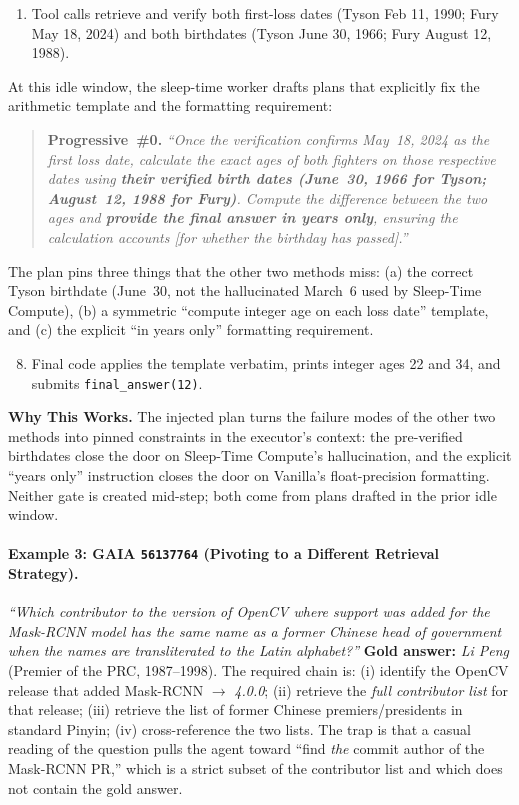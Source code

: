 \begin{tcolorbox}[colback=blue!4, colframe=blue!60!black, title=\textsc{\methodname{}} (Pred: 12 / GT: 12), fontupper=\small, breakable]
\begin{enumerate}
  \item[1-7.] Tool calls retrieve and verify both first-loss dates (Tyson Feb 11, 1990; Fury May 18, 2024) and both birthdates (Tyson June 30, 1966; Fury August 12, 1988).
\end{enumerate}
At this idle window, the sleep-time worker drafts plans that explicitly fix the arithmetic template and the formatting requirement:
\begin{quote}\small
\textbf{Progressive~\#0.} \textit{``Once the verification confirms May~18, 2024 as the first loss date, calculate the exact ages of both fighters on those respective dates using \textbf{their verified birth dates (June~30, 1966 for Tyson; August~12, 1988 for Fury)}. Compute the difference between the two ages and \textbf{provide the final answer in years only}, ensuring the calculation accounts [for whether the birthday has passed].''}
\end{quote}
The plan pins three things that the other two methods miss: (a) the correct Tyson birthdate (June~30, not the hallucinated March~6 used by Sleep-Time Compute), (b) a symmetric ``compute integer age on each loss date'' template, and (c) the explicit ``in years only'' formatting requirement.
\begin{enumerate}
\setcounter{enumi}{7}
  \item Final code applies the template verbatim, prints integer ages 22 and 34, and submits \texttt{final\_answer(12)}.
\end{enumerate}
\textbf{Why This Works.} The injected plan turns the failure modes of the other two methods into pinned constraints in the executor's context: the pre-verified birthdates close the door on Sleep-Time Compute's hallucination, and the explicit ``years only'' instruction closes the door on Vanilla's float-precision formatting. Neither gate is created mid-step; both come from plans drafted in the prior idle window.
\end{tcolorbox}

\paragraph{Example 3: GAIA \texttt{56137764} (Pivoting to a Different Retrieval Strategy).}
\textit{``Which contributor to the version of OpenCV where support was added for the Mask-RCNN model has the same name as a former Chinese head of government when the names are transliterated to the Latin alphabet?''} \textbf{Gold answer:} \emph{Li Peng} (Premier of the PRC, 1987--1998). The required chain is: (i) identify the OpenCV release that added Mask-RCNN $\rightarrow$ \emph{4.0.0}; (ii) retrieve the \emph{full contributor list} for that release; (iii) retrieve the list of former Chinese premiers/presidents in standard Pinyin; (iv) cross-reference the two lists. The trap is that a casual reading of the question pulls the agent toward ``find \emph{the} commit author of the Mask-RCNN PR,'' which is a strict subset of the contributor list and which does not contain the gold answer.

